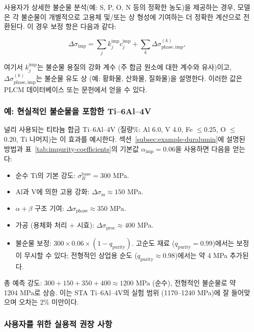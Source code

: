 \documentclass[12pt,a4paper]{article}
\begin{document}
	사용자가 상세한 불순물 분석(예: S, P, O, N 등의 정확한 농도)을 제공하는 경우, 모델은 각 불순물이 개별적으로 고용체 및/또는 상 형성에 기여하는 더 정확한 계산으로 전환된다. 이 경우 보정 항은 다음과 같다:
	
	\[
	\Delta\sigma_{\mathrm{imp}} = \sum_{j} k_j^{\mathrm{imp}} c_j^{\mathrm{imp}} + \sum_{k} \Delta\sigma_{\mathrm{phase,imp}}^{(k)},
	\]
	
	여기서 \(k_j^{\mathrm{imp}}\)는 불순물 용질의 강화 계수 (주 합금 원소에 대한 계수와 유사)이고, \(\Delta\sigma_{\mathrm{phase,imp}}^{(k)}\)는 불순물 유도 상 (예: 황화물, 산화물, 질화물)을 설명한다. 이러한 값은 PLCM 데이터베이스 또는 문헌에서 얻을 수 있다.
	
	\subsubsection*{예: 현실적인 불순물을 포함한 Ti--6Al--4V}
	
	널리 사용되는 티타늄 합금 Ti--6Al--4V (질량\%: Al 6.0, V 4.0, Fe \(\le\)0.25, O \(\le\)0.20, Ti 나머지)는 이 효과를 예시한다. 섹션~\ref{subsec:example-duralumin}에 설명된 방법과 표~\ref{tab:impurity-coefficients}의 기본값 \(\alpha_{\mathrm{imp}}=0.06\)을 사용하면 다음을 얻는다:
	
	\begin{itemize}
		\item 순수 Ti의 기본 강도: \(\sigma_B^{\mathrm{base}} = 300\) MPa.
		\item Al과 V에 의한 고용 강화: \(\Delta\sigma_{\mathrm{ss}} \approx 150\) MPa.
		\item \(\alpha+\beta\) 구조 기여: \(\Delta\sigma_{\mathrm{phase}} \approx 350\) MPa.
		\item 가공 (용체화 처리 + 시효): \(\Delta\sigma_{\mathrm{proc}} \approx 400\) MPa.
		\item 불순물 보정: \(300 \times 0.06 \times (1 - q_{\mathrm{purity}})\). 고순도 재료 (\(q_{\mathrm{purity}}=0.99\))에서는 보정이 무시할 수 있다; 전형적인 상업용 순도 (\(q_{\mathrm{purity}}\approx 0.98\))에서는 약 4 MPa 추가된다.
	\end{itemize}
	
	총 예측 강도: \(300+150+350+400 \approx 1200\) MPa (순수), 전형적인 불순물로 약 1204 MPa로 상승. 이는 STA Ti–6Al–4V의 실험 범위 (1170–1240 MPa)에 잘 들어맞으며 오차는 2\% 미만이다.
	
	\subsubsection*{사용자를 위한 실용적 권장 사항}
	
\end{document}
